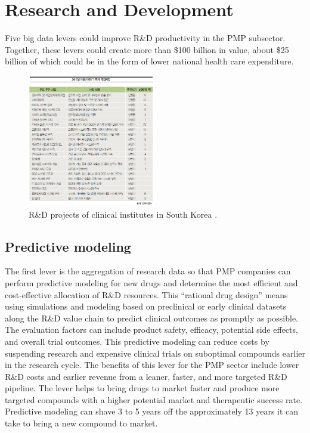 \documentclass[twocolumn]{article}
\begin{document}
\section{Research and Development}
Five big data levers could improve R\&D productivity in the PMP subsector. 
Together, these levers could create more than \$100 billion in value, about \$25 billion of which could be in the form of lower national health care expenditure.

\begin{figure}[htb]
        \centering
        \includegraphics[width=0.5\textwidth]{rnd-korea.png}
        \caption{R\&D projects of clinical institutes in South Korea \cite{Hong:2015}.}
        \label{fig:rnd-korea}
\end{figure}

\subsection{Predictive modeling}
 The first lever is the aggregation of research data so that PMP companies can perform predictive modeling for new drugs and determine the most efficient and cost-effective allocation of R\&D resources. This “rational drug design” means using simulations and modeling based on preclinical or early clinical datasets along the R\&D value chain to predict clinical outcomes as promptly as possible. The evaluation factors can include product safety, efficacy, potential side effects, and overall trial outcomes. This predictive modeling can reduce costs by suspending research and expensive clinical trials on suboptimal compounds earlier in the research cycle.
The benefits of this lever for the PMP sector include lower R\&D costs and earlier revenue from a leaner, faster, and more targeted R\&D pipeline. The lever helps to bring drugs to market faster and produce more targeted compounds with a higher potential market and therapeutic success rate. Predictive modeling can shave 3 to 5 years off the approximately 13 years it can take to bring a new compound to market.
\end{document}
